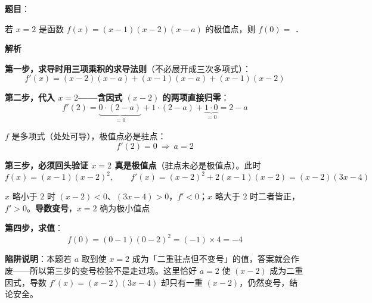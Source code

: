 \begin{answer}

\textbf{题目}：

若 $x=2$ 是函数 $f(x)=(x-1)(x-2)(x-a)$ 的极值点，则 $f(0)=$ \gkblank{}．

\textbf{解析}

\textbf{第一步，求导时用三项乘积的求导法则}（不必展开成三次多项式）：
\nopagebreak[4]
\[f'(x)=(x-2)(x-a)+(x-1)(x-a)+(x-1)(x-2)\]

\textbf{第二步，代入 $x=2$——含因式 $(x-2)$ 的两项直接归零}：
\nopagebreak[4]
\[f'(2)=\underbrace{0\cdot(2-a)}_{=0}+1\cdot(2-a)+\underbrace{1\cdot 0}_{=0}=2-a\]

$f$ 是多项式（处处可导），极值点必是驻点：
\nopagebreak[4]
\[f'(2)=0\ \Longrightarrow\ a=2\]

\textbf{第三步，必须回头验证 $x=2$ 真是极值点}（驻点未必是极值点）。此时
\nopagebreak[4]
\[f(x)=(x-1)(x-2)^2,\qquad f'(x)=(x-2)^2+2(x-1)(x-2)=(x-2)(3x-4)\]

$x$ 略小于 $2$ 时 $(x-2)<0$、$(3x-4)>0$，$f'<0$；$x$ 略大于 $2$ 时二者皆正，$f'>0$。\textbf{导数变号}，$x=2$ 确为极小值点 

\textbf{第四步，求值}：
\nopagebreak[4]
\[f(0)=(0-1)(0-2)^2=(-1)\times4=-4\]

\begin{gktip}
\textbf{陷阱说明}：本题若 $a$ 取到使 $x=2$ 成为「二重驻点但不变号」的值，答案就会作废——所以第三步的变号检验不是走过场。这里恰好 $a=2$ 使 $(x-2)$ 成为二重因式，导数 $f'(x)=(x-2)(3x-4)$ 却只有一重 $(x-2)$，仍然变号，结论安全。
\end{gktip}


\par\medskip

\end{answer}
